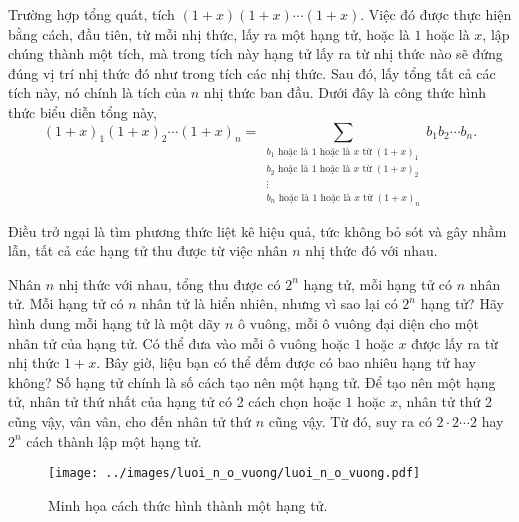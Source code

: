 \documentclass[12pt]{article} %
\begin{document}
Trường hợp tổng quát, tích \((1+x)(1+x)\cdots(1+x)\). Việc đó được thực hiện bằng cách, đầu tiên, từ mỗi nhị thức, lấy ra một hạng tử, hoặc là \(1\) hoặc là \(x\), lập chúng thành một tích, mà trong tích này hạng tử lấy ra từ nhị thức nào sẽ đứng đúng vị trí nhị thức đó như trong tích các nhị thức. Sau đó, lấy tổng tất cả các tích này, nó chính là tích của \(n\) nhị thức ban đầu. Dưới đây là công thức hình thức biểu diễn tổng này, 
\[
(1+x)_1(1+x)_2\cdots(1+x)_n
    = \sum_{\substack{b_1 \text{ hoặc là } 1 \text{ hoặc là } x \text{ từ } (1+x)_1 \\ b_2 \text{ hoặc là } 1 \text{ hoặc là } x \text{ từ } (1+x)_2 \\ \vdots \\ b_n \text{ hoặc là } 1 \text{ hoặc là } x \text{ từ } (1+x)_n  }} b_1 b_2 \cdots b_n.
\]

Điều trở ngại là tìm phương thức liệt kê hiệu quả, tức không bỏ sót và gây nhầm lẫn, tất cả các hạng tử thu được từ việc nhân \(n\) nhị thức đó với nhau.

Nhân \(n\) nhị thức với nhau, tổng thu được có \(2^n\) hạng tử, mỗi hạng tử có \(n\) nhân tử. Mỗi hạng tử có \(n\) nhân tử là hiển nhiên, nhưng vì sao lại có \(2^n\) hạng tử? Hãy hình dung mỗi hạng tử là một dãy \(n\) ô vuông, mỗi ô vuông đại diện cho một nhân tử của hạng tử. Có thể đưa vào mỗi ô vuông hoặc \(1\) hoặc \(x\) được lấy ra từ nhị thức \(1+x\). Bây giờ, liệu bạn có thể đếm được có bao nhiêu hạng tử hay không? Số hạng tử chính là số cách tạo nên một hạng tử. Để tạo nên một hạng tử, nhân tử thứ nhất của hạng tử có 2 cách chọn hoặc \(1\) hoặc \(x\), nhân tử thứ 2 cũng vậy, vân vân, cho đến nhân tử thứ \(n\) cũng vậy. Từ đó, suy ra có \(2\cdot 2\cdots 2\) hay \(2^n\) cách thành lập một hạng tử.

\begin{figure}[h!]
    \centering
    \texttt{[image: ../images/luoi\_n\_o\_vuong/luoi\_n\_o\_vuong.pdf]}
    \caption{Minh họa cách thức hình thành một hạng tử.}
\end{figure}
\end{document}
